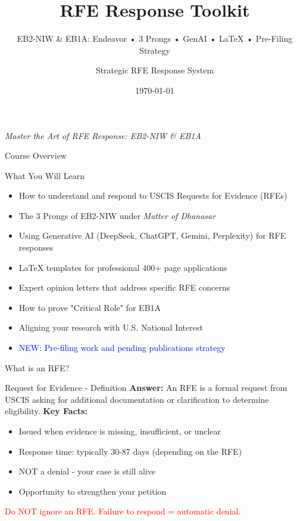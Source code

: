 \documentclass[11pt]{beamer}
\title{RFE Response Toolkit}
\subtitle{EB2-NIW \& EB1A: Endeavor • 3 Prongs • GenAI • LaTeX • Pre-Filing Strategy}
\author{Strategic RFE Response System}
\date{\today}
\begin{document}
	
	\begin{frame}
		\titlepage
		\centering
		\scriptsize \textit{Master the Art of RFE Response: EB2-NIW \& EB1A}
	\end{frame}
	
	
	\begin{frame}{Course Overview}
		\scriptsize
		\begin{block}{What You Will Learn}
			\begin{itemize}
				\item How to understand and respond to USCIS Requests for Evidence (RFEs)
				\item The 3 Prongs of EB2-NIW under \textit{Matter of Dhanasar}
				\item Using Generative AI (DeepSeek, ChatGPT, Gemini, Perplexity) for RFE responses
				\item LaTeX templates for professional 400+ page applications
				\item Expert opinion letters that address specific RFE concerns
				\item How to prove "Critical Role" for EB1A
				\item Aligning your research with U.S. National Interest
				\item \textcolor{blue}{NEW: Pre-filing work and pending publications strategy}
			\end{itemize}
		\end{block}
	\end{frame}
	
	\begin{frame}{What is an RFE?}
		\scriptsize
		\begin{block}{Request for Evidence - Definition}
			\textbf{Answer:} An RFE is a formal request from USCIS asking for additional documentation or clarification to determine eligibility.
			\vspace{0.2cm}
			\textbf{Key Facts:}
			\begin{itemize}
				\item Issued when evidence is missing, insufficient, or unclear
				\item Response time: typically 30-87 days (depending on the RFE)
				\item NOT a denial - your case is still alive
				\item Opportunity to strengthen your petition
			\end{itemize}
			\textcolor{red}{Do NOT ignore an RFE. Failure to respond = automatic denial.}
		\end{block}
	\end{frame}
	
\end{document}
